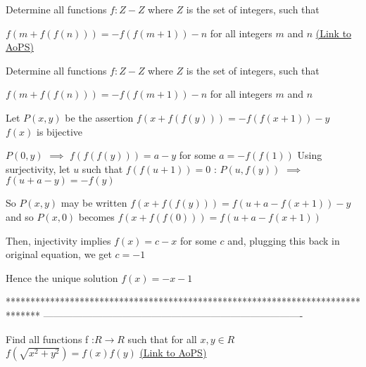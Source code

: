 \begin{problem}
	Determine all functions $f:Z - Z$ where $Z$ is the set of integers, such that 

$f(m+f(f(n)))=-f(f(m+1))-n$ for all integers $m$ and $n$
	\flushright \href{https://artofproblemsolving.com/community/c6h580160}{(Link to AoPS)}
\end{problem}



\begin{solution}
	\begin{tcolorbox}Determine all functions $f:Z - Z$ where $Z$ is the set of integers, such that 

$f(m+f(f(n)))=-f(f(m+1))-n$ for all integers $m$ and $n$\end{tcolorbox}
Let $P(x,y)$ be the assertion $f(x+f(f(y)))=-f(f(x+1))-y$
$f(x)$ is bijective

$P(0,y)$ $\implies$ $f(f(f(y)))=a-y$ for some $a=-f(f(1))$
Using surjectivity, let $u$ such that $f(f(u+1))=0$ : $P(u,f(y))$ $\implies$  $f(u+a-y)=-f(y)$

So $P(x,y)$ may be written $f(x+f(f(y)))=f(u+a-f(x+1))-y$ and so $P(x,0)$ becomes $f(x+f(f(0)))=f(u+a-f(x+1))$

Then, injectivity implies $f(x)=c-x$ for some $c$ and, plugging this back in original equation, we get $c=-1$

Hence the unique solution $\boxed{f(x)=-x-1}$
\end{solution}
*******************************************************************************
-------------------------------------------------------------------------------

\begin{problem}
	Find all functions f :$ R \to R$ such that for all $x,y \in R $
$f \left( \sqrt{x^2+y^2} \right) = f(x)f(y)$
	\flushright \href{https://artofproblemsolving.com/community/c6h580500}{(Link to AoPS)}
\end{problem}



